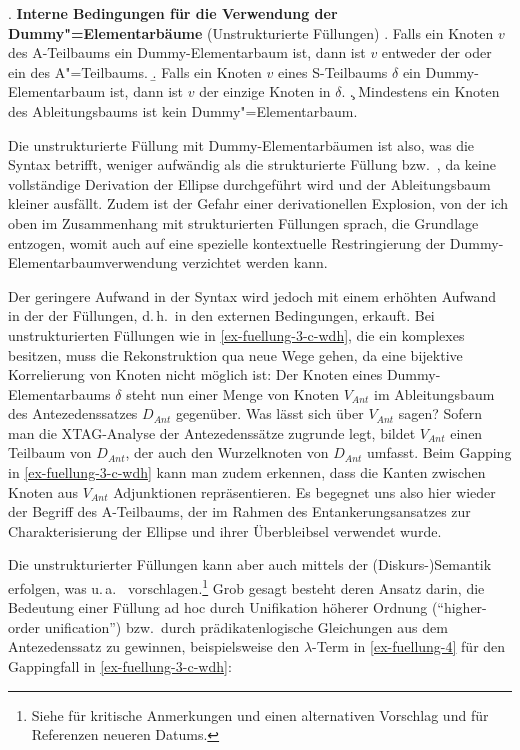 \ex. {\bf Interne Bedingungen für die Verwendung der Dummy"=Elementarbäume} (Unstrukturierte Füllungen) \label{ex-fuellung-interne-bedingungen-2}
\a. Falls ein Knoten $v$ des A-Teilbaums ein Dummy-Elementarbaum ist, dann ist $v$ entweder der  oder ein  des A"=Teilbaums.
\b. Falls ein Knoten $v$ eines S-Teilbaums $\delta$ ein Dummy-Elementarbaum ist, dann ist $v$ der einzige Knoten in $\delta$.
\c. Mindestens ein Knoten des Ableitungsbaums ist kein Dummy"=Elementarbaum.

Die unstrukturierte Füllung mit Dummy-Elementarbäumen ist also, was die Syntax betrifft, weniger aufwändig als die strukturierte Füllung bzw.\ , da keine vollständige Derivation der Ellipse durchgeführt wird und der Ableitungsbaum kleiner ausfällt. Zudem ist der Gefahr einer derivationellen Explosion, von der ich oben im Zusammenhang mit strukturierten Füllungen sprach, die Grundlage entzogen, womit auch auf eine spezielle kontextuelle Restringierung der Dummy-Elementarbaumverwendung verzichtet werden kann.

Der geringere Aufwand in der Syntax wird jedoch mit einem erhöhten Aufwand in der  der Füllungen, d.\,h.\ in den externen Bedingungen, erkauft. Bei unstrukturierten Füllungen wie in \ref{ex-fuellung-3-c-wdh}, die ein komplexes  besitzen, muss die Rekonstruktion qua  neue Wege gehen, da eine bijektive Korrelierung von Knoten nicht möglich ist: Der Knoten eines Dummy-Elementarbaums $\delta$ steht nun einer Menge von Knoten $V_{\mathit{Ant}}$ im Ableitungsbaum des Antezedenssatzes $D_{\mathit{Ant}}$ gegenüber. Was lässt sich über $V_{\mathit{Ant}}$ sagen? Sofern man die XTAG-Analyse der Antezedenssätze zugrunde legt, bildet $V_{\mathit{Ant}}$ einen Teilbaum von $D_{\mathit{Ant}}$, der auch den Wurzelknoten von $D_{\mathit{Ant}}$ umfasst. Beim Gapping in \ref{ex-fuellung-3-c-wdh} kann man zudem erkennen, dass die Kanten zwischen Knoten aus $V_{\mathit{Ant}}$ Adjunktionen repräsentieren. Es begegnet uns also hier wieder der Begriff des A-Teilbaums, der im Rahmen des Entankerungsansatzes zur Charakterisierung der Ellipse und ihrer Überbleibsel verwendet wurde. 

Die  unstrukturierter Füllungen kann aber auch mittels der (Diskurs-)Seman\-tik erfolgen, was u.\,a.\ \cite{Dalrymple:etal:91}  vorschlagen.\footnote{Siehe \citet[68f]{Hardt:93} für kritische Anmerkungen und einen alternativen Vorschlag und \cite{Winkler:Schwabe:03} für Referenzen neueren Datums.} Grob gesagt besteht deren Ansatz darin, die Bedeutung einer Füllung ad hoc durch Unifikation höherer Ordnung ("`higher-order unification"') bzw.\ durch prädikatenlogische Gleichungen aus dem Antezedenssatz zu gewinnen, beispielsweise den $\lambda$-Term in \ref{ex-fuellung-4} für den Gappingfall in \ref{ex-fuellung-3-c-wdh}:

